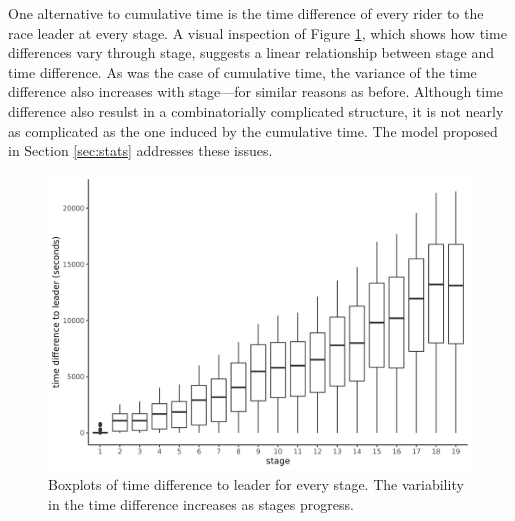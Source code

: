 \documentclass[aos,preprint]{imsart}
\begin{document}
One alternative to cumulative time is the time difference of every rider to the race leader at every stage. A visual inspection of Figure \ref{fig:timediff_stage}, which shows how time differences vary through stage, suggests a linear relationship between stage and time difference. As was the case of cumulative time, the variance of the time difference also increases with stage---for similar reasons as before. Although time difference also resulst in a combinatorially complicated structure, it is not nearly as complicated as the one induced by the cumulative time. The model proposed in Section \ref{sec:stats} addresses these issues. \\



\begin{figure}[h]
  \centering
  \includegraphics[scale=0.65]{fig/timediff_stage.png}
  \caption{Boxplots of time difference to leader for every stage. The variability in the time difference increases as stages progress.}
  \label{fig:timediff_stage}
\end{figure}



\end{document}
